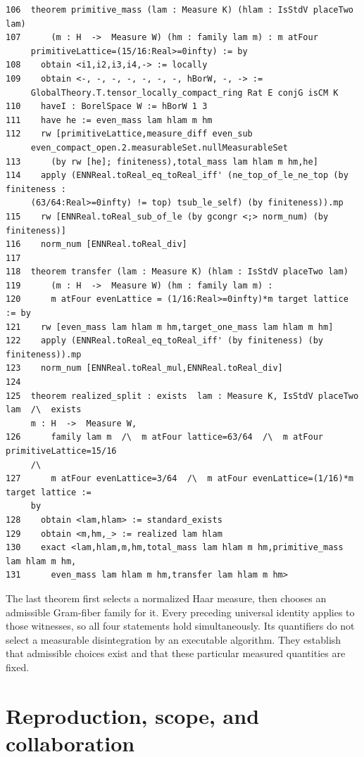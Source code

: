\documentclass[12pt,letterpaper]{article}
\begin{document}
\par
{\fontsize{9.2}{11.2}\selectfont\begin{verbatim}
106  theorem primitive_mass (lam : Measure K) (hlam : IsStdV placeTwo lam)
107      (m : H  ->  Measure W) (hm : family lam m) : m atFour
     primitiveLattice=(15/16:Real>=0infty) := by
108    obtain <i1,i2,i3,i4,-> := locally
109    obtain <-, -, -, -, -, -, -, hBorW, -, -> :=
     GlobalTheory.T.tensor_locally_compact_ring Rat E conjG isCM K
110    haveI : BorelSpace W := hBorW 1 3
111    have he := even_mass lam hlam m hm
112    rw [primitiveLattice,measure_diff even_sub
     even_compact_open.2.measurableSet.nullMeasurableSet
113      (by rw [he]; finiteness),total_mass lam hlam m hm,he]
114    apply (ENNReal.toReal_eq_toReal_iff' (ne_top_of_le_ne_top (by finiteness :
     (63/64:Real>=0infty) != top) tsub_le_self) (by finiteness)).mp
115    rw [ENNReal.toReal_sub_of_le (by gcongr <;> norm_num) (by finiteness)]
116    norm_num [ENNReal.toReal_div]
117
118  theorem transfer (lam : Measure K) (hlam : IsStdV placeTwo lam)
119      (m : H  ->  Measure W) (hm : family lam m) :
120      m atFour evenLattice = (1/16:Real>=0infty)*m target lattice := by
121    rw [even_mass lam hlam m hm,target_one_mass lam hlam m hm]
122    apply (ENNReal.toReal_eq_toReal_iff' (by finiteness) (by finiteness)).mp
123    norm_num [ENNReal.toReal_mul,ENNReal.toReal_div]
124
125  theorem realized_split : exists  lam : Measure K, IsStdV placeTwo lam  /\  exists
     m : H  ->  Measure W,
126      family lam m  /\  m atFour lattice=63/64  /\  m atFour primitiveLattice=15/16
     /\
127      m atFour evenLattice=3/64  /\  m atFour evenLattice=(1/16)*m target lattice :=
     by
128    obtain <lam,hlam> := standard_exists
129    obtain <m,hm,_> := realized lam hlam
130    exact <lam,hlam,m,hm,total_mass lam hlam m hm,primitive_mass lam hlam m hm,
131      even_mass lam hlam m hm,transfer lam hlam m hm>
\end{verbatim}}
The last theorem first selects a normalized Haar measure, then chooses an admissible Gram-fiber family for it. Every preceding universal identity applies to those witnesses, so all four statements hold simultaneously. Its quantifiers do not select a measurable disintegration by an executable algorithm. They establish that admissible choices exist and that these particular measured quantities are fixed.
\clearpage\section{Reproduction, scope, and collaboration}\label{collab}
\end{document}
